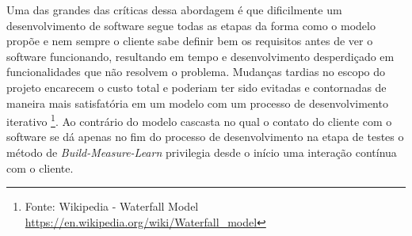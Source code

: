 \par Uma das grandes das críticas dessa abordagem é que dificilmente um desenvolvimento de software segue todas as etapas da forma como o modelo propõe e nem sempre o cliente sabe definir bem os requisitos antes de ver o software funcionando, resultando em tempo e desenvolvimento desperdiçado em funcionalidades que não resolvem o problema. Mudanças tardias no escopo do projeto encarecem o custo total e poderiam ter sido evitadas e contornadas de maneira mais satisfatória em um modelo com um processo de desenvolvimento iterativo \footnote{ Fonte: Wikipedia - Waterfall Model \url {https://en.wikipedia.org/wiki/Waterfall_model}}. Ao contrário do modelo cascasta no qual o contato do cliente com o software se dá apenas no fim do processo de desenvolvimento na etapa de testes o método de \emph{Build-Measure-Learn} privilegia desde o início uma interação contínua com o cliente.

